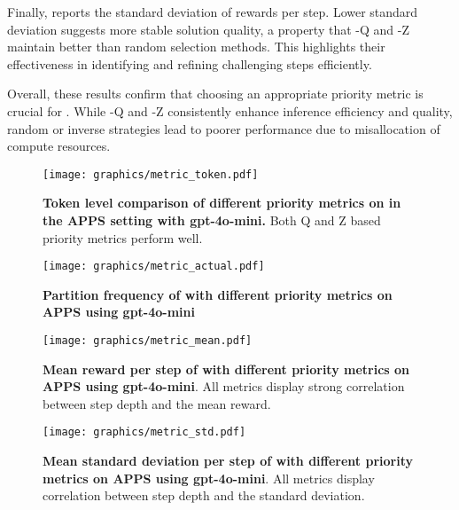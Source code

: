 Finally,  reports the standard deviation of rewards per step. Lower standard deviation suggests more stable solution quality, a property that \decomp-Q and \decomp-Z maintain better than random selection methods. This highlights their effectiveness in identifying and refining challenging steps efficiently.

Overall, these results confirm that choosing an appropriate priority metric is crucial for \decomp. While \decomp-Q and \decomp-Z consistently enhance inference efficiency and quality, random or inverse strategies lead to poorer performance due to misallocation of compute resources.


\begin{figure}[ht]
    \centering
    \texttt{[image: graphics/metric\_token.pdf]}
    \caption{\textbf{Token level comparison of different priority metrics on \decomp in the APPS setting with gpt-4o-mini.} Both Q and Z based priority metrics perform well.}
    \label{fig:metric_token}
\end{figure}


\begin{figure}[ht]
    \centering
    \texttt{[image: graphics/metric\_actual.pdf]}
    \caption{\textbf{Partition frequency of \decomp with different priority metrics on APPS using gpt-4o-mini}}
    \label{fig:metric_actualpart}
\end{figure}

\begin{figure}[ht]
    \centering
    \texttt{[image: graphics/metric\_mean.pdf]}
    \caption{\textbf{Mean reward per step of \decomp with different priority metrics on APPS using gpt-4o-mini}. All metrics display strong correlation between step depth and the mean reward.}
    \label{fig:metric_rewardstep}
\end{figure}

\begin{figure}[ht]
    \centering
    \texttt{[image: graphics/metric\_std.pdf]}
    \caption{\textbf{Mean standard deviation per step of \decomp with different priority metrics on APPS using gpt-4o-mini}. All metrics display correlation between step depth and the standard deviation.}
    \label{fig:metric_stdstep}
\end{figure}


\newpage
